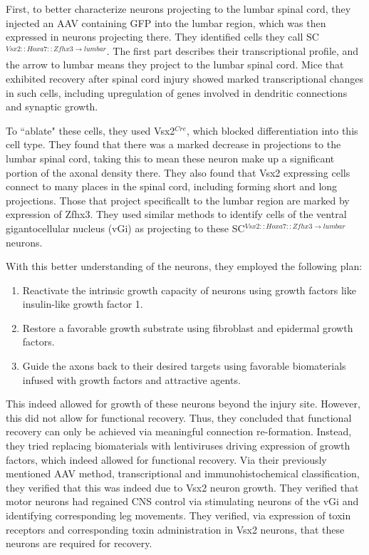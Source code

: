 First, to better characterize neurons projecting to the lumbar spinal cord, they injected an AAV containing GFP into the lumbar region, which was then expressed in neurons projecting there. They identified cells they call SC$^{Vsx2::Hoxa7::Zfhx3\rightarrow lumbar}$. The first part describes their transcriptional profile, and the arrow to lumbar means they project to the lumbar spinal cord. Mice that exhibited recovery after spinal cord injury showed marked transcriptional changes in such cells, including upregulation of genes involved in dendritic connections and synaptic growth.\newline

To ``ablate" these cells, they used Vsx2$^{Cre}$, which blocked differentiation into this cell type. They found that there was a marked decrease in projections to the lumbar spinal cord, taking this to mean these neuron make up a significant portion of the axonal density there. They also found that Vsx2 expressing cells connect to many places in the spinal cord, including forming short and long projections. Those that project specificallt to the lumbar region are marked by expression of Zfhx3. They used similar methods to identify cells of the ventral gigantocellular nucleus (vGi) as projecting to these SC$^{Vsx2::Hoxa7::Zfhx3\rightarrow lumbar}$ neurons.\newline

With this better understanding of the neurons, they employed the following plan: 
\begin{enumerate}
    \itemsep 0em
    \item Reactivate the intrinsic growth capacity of neurons using growth factors like insulin-like growth factor 1. 
    \item Restore a favorable growth substrate using fibroblast and epidermal growth factors. 
    \item Guide the axons back to their desired targets using favorable biomaterials infused with growth factors and attractive agents. 
\end{enumerate}

This indeed allowed for growth of these neurons beyond the injury site. However, this did not allow for functional recovery. Thus, they concluded that functional recovery can only be achieved via meaningful connection re-formation. Instead, they tried replacing biomaterials with lentiviruses driving expression of growth factors, which indeed allowed for functional recovery. Via their previously mentioned AAV method, transcriptional and immunohistochemical classification, they verified that this was indeed due to Vsx2 neuron growth. They verified that motor neurons had regained CNS control via stimulating neurons of the vGi and identifying corresponding leg movements. They verified, via expression of toxin receptors and corresponding toxin administration in Vsx2 neurons, that these neurons are required for recovery. 

